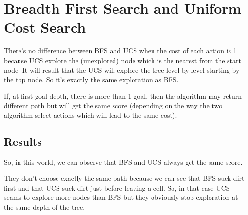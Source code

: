 \section{Breadth First Search and Uniform Cost Search}
There's no difference between BFS and UCS when the cost of each action is 1 because UCS explore the (unexplored) node which is the nearest from the start node. It will result that the UCS will explore the tree level by level starting by the top node. So it's exactly the same exploration as BFS.

If, at first goal depth, there is more than 1 goal, then the algorithm may return different path but will get the same score (depending on the way the two algorithm select actions which will lead to the same cost).

  \subsection{Results}
So, in this world, we can observe that BFS and UCS always get the same score.

They don't choose exactly the same path because we can see that BFS suck dirt first and that UCS suck dirt just before leaving a cell.
So, in that case UCS seams to explore more nodes than BFS but they obviously stop exploration at the same depth of the tree.

